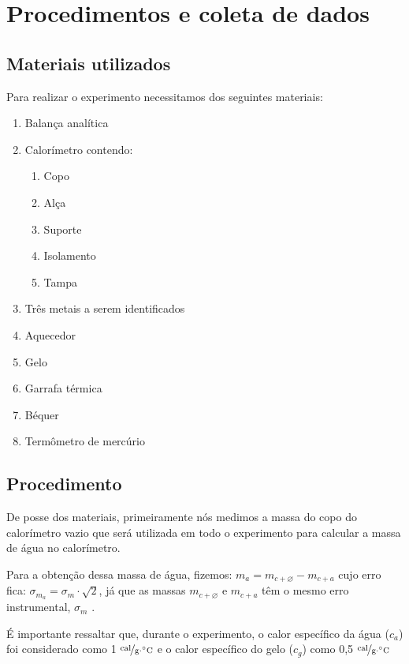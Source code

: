 \documentclass[a4paper]{article}
\begin{document}
	\section{Procedimentos e coleta de dados}

		\subsection{Materiais utilizados}

			Para realizar o experimento necessitamos dos seguintes materiais:
			\begin{enumerate}
				\item Balança analítica 
				\item Calorímetro contendo:
					\begin{enumerate}
						\item Copo 
						\item Alça 
						\item Suporte 
						\item Isolamento 
						\item Tampa
					\end{enumerate}
				\item Três metais a serem identificados 
				\item Aquecedor 
				\item Gelo 
				\item Garrafa térmica 
				\item Béquer 
				\item Termômetro de mercúrio 
			\end{enumerate}

		\subsection{Procedimento}

			De posse dos materiais, primeiramente nós medimos a massa do copo
			do calorímetro vazio que será utilizada em todo o experimento para
			calcular a massa de água no calorímetro.

			Para a obtenção dessa massa de água, fizemos: $m_{a}=m_{c+\varnothing}-m_{c+a}$
			cujo erro fica: $\sigma_{m_{a}}=\sigma_{m}\cdot\sqrt{2}$, já que
			as massas $m_{c+\varnothing}$ e $m_{c+a}$ têm o mesmo erro instrumental,
			$\sigma_{m}$ .

			É importante ressaltar que, durante o experimento, o calor específico
			da água ($c_{a}$) foi considerado como 1 $\unitfrac{cal}{g\cdot^{\circ}C}$
			e o calor específico do gelo ($c_{g}$) como 0,5 $\unitfrac{cal}{g\cdot^{\circ}C}$
\end{document}
